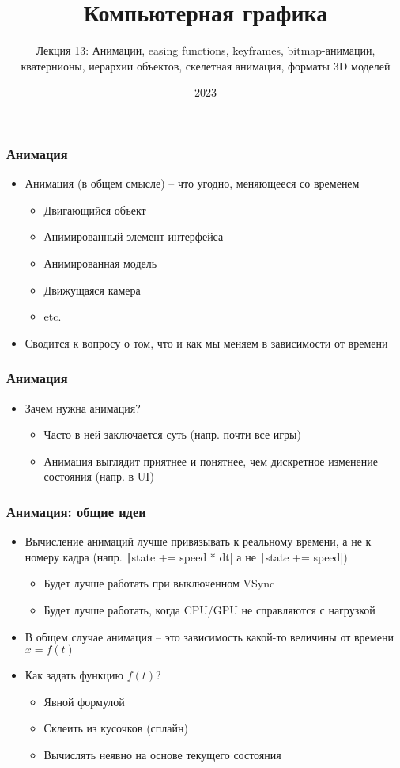 \documentclass[10pt]{beamer}
\title{Компьютерная графика}
\subtitle{Лекция 13: Анимации, easing functions, keyframes, bitmap-анимации, кватернионы, иерархии объектов, скелетная анимация, форматы 3D моделей}
\date{2023}
\begin{document}
\frame{\titlepage}

\begin{frame}[fragile]
\frametitle{Анимация}
\begin{itemize}
\item Анимация (в общем смысле) -- что угодно, меняющееся со временем
\pause
\begin{itemize}
\item Двигающийся объект
\pause
\item Анимированный элемент интерфейса
\pause
\item Анимированная модель
\pause
\item Движущаяся камера
\pause
\item etc.
\end{itemize}
\pause
\item Сводится к вопросу о том, что и как мы меняем в зависимости от времени
\end{itemize}
\end{frame}

\begin{frame}[fragile]
\frametitle{Анимация}
\begin{itemize}
\item Зачем нужна анимация?
\pause
\begin{itemize}
\item Часто в ней заключается суть (напр. почти все игры)
\pause
\item Анимация выглядит приятнее и понятнее, чем дискретное изменение состояния (напр. в UI)
\end{itemize}  
\end{itemize}
\end{frame}

\begin{frame}[fragile]
\frametitle{Анимация: общие идеи}
\begin{itemize}
\item Вычисление анимаций лучше привязывать к реальному времени, а не к номеру кадра (напр. \texttt|state += speed * dt| а не \texttt|state += speed|)
\pause
\begin{itemize}
\item Будет лучше работать при выключенном VSync
\pause
\item Будет лучше работать, когда CPU/GPU не справляются с нагрузкой
\end{itemize}
\pause
\item В общем случае анимация -- это зависимость какой-то величины от времени \begin{math}x = f(t)\end{math}
\pause
\item Как задать функцию \begin{math}f(t)\end{math}?
\pause
\begin{itemize}
\item Явной формулой
\pause
\item Склеить из кусочков (сплайн)
\pause
\item Вычислять неявно на основе текущего состояния
\end{itemize}
\end{itemize}
\end{frame}
\end{document}
